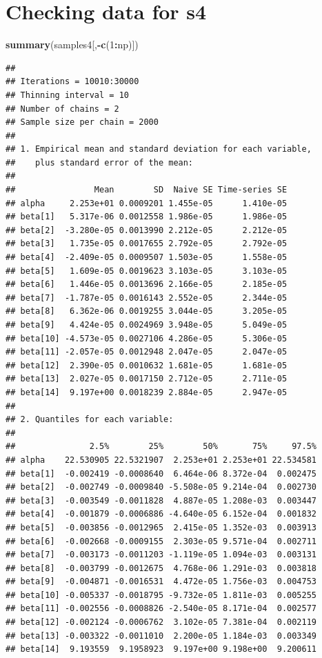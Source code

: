 \documentclass[
]{article}
\newenvironment{Shaded}{\begin{snugshade}}{\end{snugshade}}
\newcommand{\DecValTok}[1]{\textcolor[rgb]{0.00,0.00,0.81}{#1}}
\newcommand{\FunctionTok}[1]{\textcolor[rgb]{0.13,0.29,0.53}{\textbf{#1}}}
\newcommand{\NormalTok}[1]{#1}
\newcommand{\SpecialCharTok}[1]{\textcolor[rgb]{0.81,0.36,0.00}{\textbf{#1}}}
\begin{document}
\section{Checking data for s4}\label{checking-data-for-s4}

\begin{Shaded}
\begin{Highlighting}[]
\FunctionTok{summary}\NormalTok{(samples4[,}\SpecialCharTok{{-}}\FunctionTok{c}\NormalTok{(}\DecValTok{1}\SpecialCharTok{:}\NormalTok{np)])}
\end{Highlighting}
\end{Shaded}

\begin{verbatim}
## 
## Iterations = 10010:30000
## Thinning interval = 10 
## Number of chains = 2 
## Sample size per chain = 2000 
## 
## 1. Empirical mean and standard deviation for each variable,
##    plus standard error of the mean:
## 
##                Mean        SD  Naive SE Time-series SE
## alpha     2.253e+01 0.0009201 1.455e-05      1.410e-05
## beta[1]   5.317e-06 0.0012558 1.986e-05      1.986e-05
## beta[2]  -3.280e-05 0.0013990 2.212e-05      2.212e-05
## beta[3]   1.735e-05 0.0017655 2.792e-05      2.792e-05
## beta[4]  -2.409e-05 0.0009507 1.503e-05      1.558e-05
## beta[5]   1.609e-05 0.0019623 3.103e-05      3.103e-05
## beta[6]   1.446e-05 0.0013696 2.166e-05      2.185e-05
## beta[7]  -1.787e-05 0.0016143 2.552e-05      2.344e-05
## beta[8]   6.362e-06 0.0019255 3.044e-05      3.205e-05
## beta[9]   4.424e-05 0.0024969 3.948e-05      5.049e-05
## beta[10] -4.573e-05 0.0027106 4.286e-05      5.306e-05
## beta[11] -2.057e-05 0.0012948 2.047e-05      2.047e-05
## beta[12]  2.390e-05 0.0010632 1.681e-05      1.681e-05
## beta[13]  2.027e-05 0.0017150 2.712e-05      2.711e-05
## beta[14]  9.197e+00 0.0018239 2.884e-05      2.947e-05
## 
## 2. Quantiles for each variable:
## 
##               2.5%        25%        50%       75%     97.5%
## alpha    22.530905 22.5321907  2.253e+01 2.253e+01 22.534581
## beta[1]  -0.002419 -0.0008640  6.464e-06 8.372e-04  0.002475
## beta[2]  -0.002749 -0.0009840 -5.508e-05 9.214e-04  0.002730
## beta[3]  -0.003549 -0.0011828  4.887e-05 1.208e-03  0.003447
## beta[4]  -0.001879 -0.0006886 -4.640e-05 6.152e-04  0.001832
## beta[5]  -0.003856 -0.0012965  2.415e-05 1.352e-03  0.003913
## beta[6]  -0.002668 -0.0009155  2.303e-05 9.571e-04  0.002711
## beta[7]  -0.003173 -0.0011203 -1.119e-05 1.094e-03  0.003131
## beta[8]  -0.003799 -0.0012675  4.768e-06 1.291e-03  0.003818
## beta[9]  -0.004871 -0.0016531  4.472e-05 1.756e-03  0.004753
## beta[10] -0.005337 -0.0018795 -9.732e-05 1.811e-03  0.005255
## beta[11] -0.002556 -0.0008826 -2.540e-05 8.171e-04  0.002577
## beta[12] -0.002124 -0.0006762  3.102e-05 7.381e-04  0.002119
## beta[13] -0.003322 -0.0011010  2.200e-05 1.184e-03  0.003349
## beta[14]  9.193559  9.1958923  9.197e+00 9.198e+00  9.200611
\end{verbatim}
\end{document}
